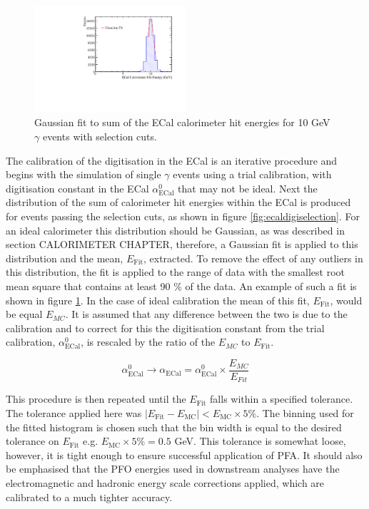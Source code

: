 \begin{figure}
\includegraphics[width=0.5\textwidth]{EnergyEstimators/Plots/Calibration/Digitsation/ECal/DigitisationECalFit.pdf}
\caption[Gaussian fit to sum of the ECal calorimeter hit energies for 10 GeV $\gamma$ events with selection cuts.]{Gaussian fit to sum of the ECal calorimeter hit energies for 10 GeV $\gamma$ events with selection cuts.}
\label{fig:ecaldigifit}
\end{figure}

The calibration of the digitisation in the ECal is an iterative procedure and begins with the simulation of single $\gamma$ events using a trial calibration, with digitisation constant in the ECal $\alpha^{0}_{\text{ECal}}$ that may not be ideal.  Next the distribution of the sum of calorimeter hit energies within the ECal is produced for events passing the selection cuts, as shown in figure \ref{fig:ecaldigiselection}.  For an ideal calorimeter this distribution should be Gaussian, as was described in section CALORIMETER CHAPTER, therefore, a Gaussian fit is applied to this distribution and the mean, $E_{\text{Fit}}$, extracted.  To remove the effect of any outliers in this distribution, the fit is applied to the range of data with the smallest root mean square that contains at least 90 \% of the data.  An example of such a fit is shown in figure \ref{fig:ecaldigifit}.  In the case of ideal calibration the mean of this fit, $E_{\text{Fit}}$, would be equal $E_{MC}$.  It is assumed that any difference between the two is due to the calibration and to correct for this the digitisation constant from the trial calibration, $\alpha^{0}_{\text{ECal}}$, is rescaled by the ratio of the $E_{MC}$ to $E_{\text{Fit}}$.

\begin{equation}
\alpha^{0}_{\text{ECal}} \rightarrow \alpha_{\text{ECal}} = \alpha^{0}_{\text{ECal}} \times \frac{E_{MC}}{E_{Fit}}
\end{equation}

This procedure is then repeated until the $E_{\text{Fit}}$ falls within a specified tolerance.  The tolerance applied here was $|E_{\text{Fit}} - E_{\text{MC}}| < E_{\text{MC}} \times 5 \%$.  The binning used for the fitted histogram is chosen such that the bin width is equal to the desired tolerance on $E_{\text{Fit}}$ e.g. $E_{\text{MC}} \times 5 \% = 0.5$ GeV.  This tolerance is somewhat loose, however, it is tight enough to ensure successful application of PFA.  It should also be emphasised that the PFO energies used in downstream analyses have the electromagnetic and hadronic energy scale corrections applied, which are calibrated to a much tighter accuracy.

